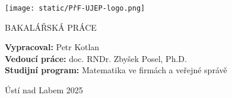 \begin{titlepage}
    \begin{center}
        \Huge

        \textbf{\textsf{}}
            
        \vspace{1cm}
        \LARGE
        \textbf{\textsf{}}
        
        \vspace{2cm}
        \texttt{[image: static/PřF-UJEP-logo.png]}
        \vspace{3cm}
            
        \textbf{\textsf{}}
        
        \vspace{1cm}

        \large
        BAKALÁŘSKÁ PRÁCE

        \vfill

            \begin{flushleft}
                
            \large
            \textbf{Vypracoval:} Petr Kotlan \\
            \vspace{0.3cm}
            \textbf{Vedoucí práce:} doc. RNDr. Zbyšek Posel, Ph.D. \\
            \vspace{1.5cm}
            \textbf{Studijní program:} Matematika ve firmách a veřejné správě
        \end{flushleft}

        \vspace{1.5cm}
        
        \LARGE
        Ústí nad Labem 2025

    \end{center}
\end{titlepage}
